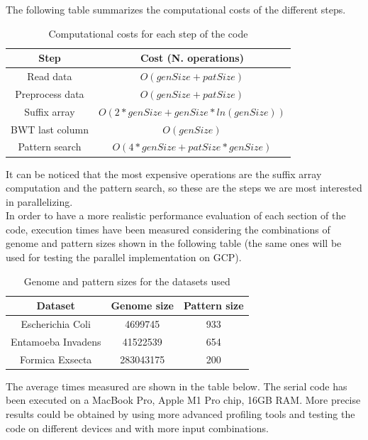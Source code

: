 \documentclass[final,5p,times,twocolumn,authoryear]{elsarticle}
\begin{document}
The following table summarizes the computational costs of the different steps.
\begin{table}[H]
\begin{center}
\begin{tabular}{|| c c ||}
\hline
Step & Cost (N. operations) \\
\hline
 Read data & $O(genSize + patSize)$ \\ 
 Preprocess data & $O(genSize + patSize)$ \\  
 Suffix array & $O(2*genSize + genSize*ln(genSize))$ \\
 BWT last column & $O(genSize)$ \\
 Pattern search & $O(4*genSize + patSize*genSize)$ \\
\hline
\end{tabular}
\caption{Computational costs for each step of the code}
\end{center}
\end{table}
It can be noticed that the most expensive operations are the suffix array computation and the pattern search, so these are the steps we are most interested in parallelizing. \\
In order to have a more realistic performance evaluation of each section of the code, execution times have been measured considering the combinations of genome and pattern sizes shown in the following table (the same ones will be used for testing the parallel implementation on GCP).
\begin{table}[H]
\begin{center}
\begin{tabular}{|| c c c ||}
\hline
Dataset & Genome size & Pattern size \\
\hline
 Escherichia Coli & 4699745 & 933 \\
 Entamoeba Invadens & 41522539 & 654 \\
 Formica Exsecta & 283043175 & 200 \\
\hline
\end{tabular}
\end{center}
\caption{Genome and pattern sizes for the datasets used}
\vspace{-2mm}%
\end{table}
The average times measured are shown in the table below. The serial code has been executed on a MacBook Pro, Apple M1 Pro chip, 16GB RAM. More precise results could be obtained by using more advanced profiling tools and testing the code on different devices and with more input combinations.
\end{document}
